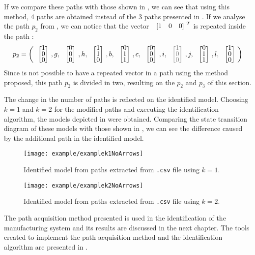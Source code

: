 If we compare these paths with those shown in ,
we can see that using this method, 4 paths are obtained instead of the 3 paths presented in .
If we analyse the path $p_2$ from , we can notice that the vector $\colvec{1&0&0}^ T$ is repeated inside the path :
\begin{align*}
  p_2&= \left(\colvec{1\\0\\0},g,\colvec{0\\0\\0},h,\colvec{1\\1\\0},b,\colvec{0\\1\\1},c,\colvec{0\\0\\0},i,{\color{gray} \colvec{1\\0\\0}},j,\colvec{0\\1\\1},l,\colvec{1\\0\\0}\right) \\
\end{align*}
Since is not possible to have a repeated vector in a path using the method proposed, this path $p_2$ is divided in two, resulting on the $p_2$ and $p_3$ of this section. 

 The change in the number of paths is reflected on the
 identified model. Choosing $k=1$ and $k=2$ for the modified paths and executing the identification algorithm, the models depicted in  were obtained.
Comparing the state transition diagram of these models with those shown in , we can see the difference
caused by the additional path in the identified model.
\begin{figure}[H]
  \centering
  \texttt{[image: example/examplek1NoArrows]}
  \caption{Identified model from paths extracted from \texttt{.csv} file using $k=1$.}
  \label{fig:identExamplekone}
\end{figure}

\begin{figure}[H]
  \centering
  \centering
  \texttt{[image: example/examplek2NoArrows]}
  \caption{Identified model from paths extracted from \texttt{.csv} file using $k=2$.}
  \label{fig:identExamplektwo}
\end{figure}

The path acquisition method presented is used in the identification of the manufacturing system and its results are discussed in the next chapter. 
The tools created to implement the path acquisition method and the identification algorithm are presented in .


